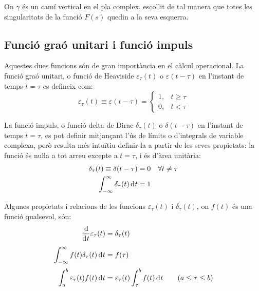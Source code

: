 On $\gamma$ és un camí vertical en el pla complex, escollit de tal
manera que totes les singularitats de la funció $F(s)$ quedin a la
seva esquerra.

\subsection{Funció graó unitari i funció impuls} 

Aquestes dues funcions són de gran importància en el càlcul
operacional. La funció graó unitari, o funció de Heaviside
$\varepsilon_\tau(t)$ o $\varepsilon(t-\tau)$ en l'instant de temps
$t=\tau$ es defineix com:
\begin{equation}
    \varepsilon_\tau(t) \equiv \varepsilon(t-\tau) = \begin{cases} 1, & t \geq \tau \\ 0, & t < \tau \end{cases}
\end{equation}

La funció impuls, o funció delta de Dirac $\delta_\tau(t)$ o
$\delta(t-\tau)$ en l'instant de temps $t=\tau$, es pot definir
mitjançant l'ús de límits o d'integrals de variable complexa, però
resulta més intuïtiu definir-la a partir de les seves propietats: la
funció és nuŀla a tot arreu excepte a $t=\tau$, i és d'àrea
unitària:
\begin{subequations}
\begin{align}
    \delta_\tau(t) \equiv \delta(t-\tau) &= 0 \quad \forall t \neq \tau \\
    \int_{-\infty}^\infty \delta_\tau(t) \diff t &= 1
\end{align}
\end{subequations}

Algunes propietats i relacions de les funcions $\varepsilon_\tau(t)$ i $\delta_\tau(t)$, on $f(t)$ és una funció qualsevol, són:
\begin{align}
   \frac{\diff}{\diff t} \varepsilon_\tau (t) &= \delta_\tau(t) \\[0.5ex]
   \int_{-\infty}^\infty f(t) \delta_\tau (t) \diff t &= f(\tau) \\[0.5ex]
    \int_a^b \varepsilon_\tau (t) f(t) \diff t &= \varepsilon_\tau(t)
    \int_\tau^b f(t) \diff t \qquad (a\leq\tau\leq b)
\end{align}



